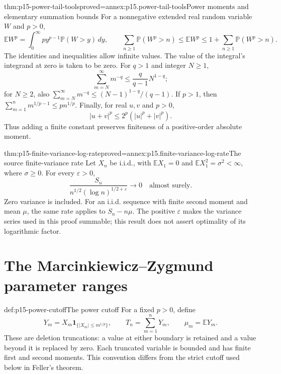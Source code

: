 \begin{hblemma}{thm:p15-power-tail-tools}{proved=annex:p15.power-tail-tools}{Power moments and elementary summation bounds}
For a nonnegative extended real random variable \(W\) and \(p>0\),
\[
 \mathbb EW^p=\int_0^\infty p y^{p-1}\mathbb P(W>y)\,dy,
 \qquad
 \sum_{n\geq1}\mathbb P(W^p>n)
       \leq\mathbb EW^p
       \leq1+\sum_{n\geq1}\mathbb P(W^p>n).
\]
The identities and inequalities allow infinite values. The value of
the integral's integrand at zero is taken to be zero.
For \(q>1\) and integer \(N\geq1\),
\[
 \sum_{m=N}^\infty m^{-q}
       \leq\frac{q}{q-1}N^{1-q};
\]
for \(N\geq2\), also
\(\sum_{m=N}^\infty m^{-q}\leq (N-1)^{1-q}/(q-1)\).
If \(p>1\), then
\(\sum_{m=1}^n m^{1/p-1}\leq p n^{1/p}\).
Finally, for real \(u,v\) and \(p>0\),
\[
 |u+v|^p\leq2^p(|u|^p+|v|^p).
\]
Thus adding a finite constant preserves finiteness of a positive-order
absolute moment.
\end{hblemma}

\begin{hbtheorem}{thm:p15-finite-variance-log-rate}{proved=annex:p15.finite-variance-log-rate}{The source finite-variance rate}
Let \(X_n\) be i.i.d., with \(\mathbb EX_1=0\) and
\(\mathbb EX_1^2=\sigma^2<\infty\), where \(\sigma\geq0\). For every
\(\varepsilon>0\),
\[
 \frac{S_n}{n^{1/2}(\log n)^{1/2+\varepsilon}}
                       \longrightarrow0\quad\text{almost surely}.
\]
Zero variance is included. For an i.i.d. sequence with finite second
moment and mean \(\mu\), the same rate applies to \(S_n-n\mu\).
The positive \(\varepsilon\) makes the variance series used in this
proof summable; this result does not assert optimality of its logarithmic
factor.
\end{hbtheorem}

\section{The Marcinkiewicz--Zygmund parameter ranges}
\label{sec:p15-mz-ranges}

\begin{hbdefinition}{def:p15-power-cutoff}{The power cutoff}
For a fixed \(p>0\), define
\[
 Y_m=X_m\mathbf1_{\{|X_m|\leq m^{1/p}\}},\qquad
 T_n=\sum_{m=1}^nY_m,\qquad \mu_m=\mathbb EY_m.
\]
These are deletion truncations: a value at either boundary is retained
and a value beyond it is replaced by zero. Each truncated variable is
bounded and has finite first and second moments. This convention differs
from the strict cutoff used below in Feller's theorem.
\end{hbdefinition}

